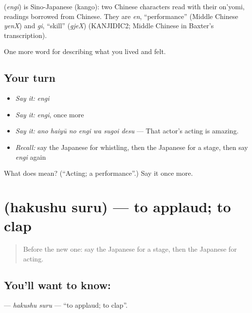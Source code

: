\begin{cousinweb}
\textbf{} (\emph{engi}) is Sino-Japanese (kango): two Chinese characters read with their on'yomi, readings borrowed from Chinese. They are \emph{en}, \textquotedblleft{}performance\textquotedblright{} (Middle Chinese \emph{yenX}) and \emph{gi}, \textquotedblleft{}skill\textquotedblright{} (\emph{gjeX}) (KANJIDIC2; Middle Chinese in Baxter's transcription).
\end{cousinweb}

\begin{grammarlens}[title={What you've built}]
One more word for describing what you lived and felt.
\end{grammarlens}

\subsection*{Your turn}
\begin{itemize}
\raggedright
  \item \emph{Say it:} \emph{engi}
  \item \emph{Say it:} \emph{engi}, once more
  \item \emph{Say it:} \emph{ano haiyū no engi wa sugoi desu} — That actor's acting is amazing.
  \item \emph{Recall:} say the Japanese for whistling, then the Japanese for a stage, then say \emph{engi} again
\end{itemize}

\begin{tcolorbox}[breakable,colback=teal!4,colframe=teal!35!black,title={Before you move on}]
What does  mean? (\textquotedblleft{}Acting; a performance\textquotedblright{}.) Say it once more.
\end{tcolorbox}
\section[\texorpdfstring{\ja{はくしゅする} (hakushu suru)}{はくしゅする (hakushu suru)}]{ (hakushu suru) — to applaud; to clap}

\label{lesson:JA-C471-hakushu-suru}



\begin{quote}
Before the new one: say the Japanese for a stage, then the Japanese for acting.
\end{quote}

\subsection*{You'll want to know: }
\textbf{} — \emph{hakushu suru} — \textquotedblleft{}to applaud; to clap\textquotedblright{}.

